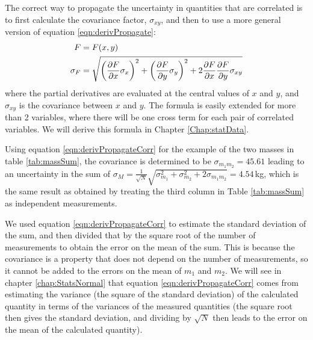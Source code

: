 
The correct way to propagate the uncertainty in quantities that are correlated is to first calculate the covariance factor, $\sigma_{xy}$, and then to use a more general version of equation \ref{eqn:derivPropagate}:
\begin{align}
\label{eqn:derivPropagateCorr}
F&=F(x,y)\nonumber\\
\sigma_F &= \sqrt{\left(\frac{\partial F}{\partial x}\sigma_x\right)^2 + \left(\frac{\partial F}{\partial y} \sigma_y\right)^2+2\frac{\partial F}{\partial x}\frac{\partial F}{\partial y}\sigma_{xy}}
\end{align}
where the partial derivatives are evaluated at the central values of $x$ and $y$, and $\sigma_{xy}$ is the covariance between $x$ and $y$. The formula is easily extended for more than 2 variables, where there will be one cross term for each pair of correlated variables. We will derive this formula in Chapter \ref{Chap:statData}.

Using equation \ref{eqn:derivPropagateCorr} for the example of the two masses in table \ref{tab:massSum}, the covariance is determined to be $\sigma_{m_1m_2}=45.61$ leading to an uncertainty in the sum of $\sigma_M=\frac{1}{\sqrt{N}}\sqrt{\sigma_{m_1}^2+\sigma_{m_2}^2+2\sigma_{m_1m_2}}=4.54$\,kg, which is the same result as obtained by treating the third column in Table \ref{tab:massSum} as independent measurements.

We used equation \ref{eqn:derivPropagateCorr} to estimate the standard deviation of the sum, and then divided that by the square root of the number of measurements to obtain the error on the mean of the sum. This is because the covariance is a property that does not depend on the number of measurements, so it cannot be added to the errors on the mean of $m_1$ and $m_2$. We will see in chapter \ref{chap:StatsNormal} that equation \ref{eqn:derivPropagateCorr} comes from estimating the variance (the square of the standard deviation) of the calculated quantity in terms of the variances of the measured quantities (the square root then gives the standard deviation, and dividing by $\sqrt{N}$ then leads to the error on the mean of the calculated quantity).

